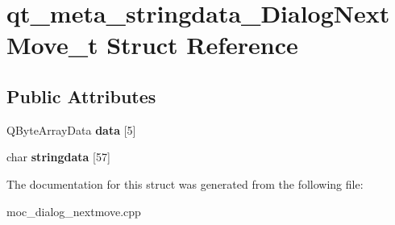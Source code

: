 \hypertarget{structqt__meta__stringdata__DialogNextMove__t}{\section{qt\-\_\-meta\-\_\-stringdata\-\_\-\-Dialog\-Next\-Move\-\_\-t Struct Reference}
\label{structqt__meta__stringdata__DialogNextMove__t}
}
\subsection*{Public Attributes}
\begin{DoxyCompactItemize}
\item 
\hypertarget{structqt__meta__stringdata__DialogNextMove__t_a0009eb2ef561102724f87fa9fd1028fc}{Q\-Byte\-Array\-Data {\bfseries data} \mbox{[}5\mbox{]}}\label{structqt__meta__stringdata__DialogNextMove__t_a0009eb2ef561102724f87fa9fd1028fc}

\item 
\hypertarget{structqt__meta__stringdata__DialogNextMove__t_a043103d55e547887ada1d2142419ed05}{char {\bfseries stringdata} \mbox{[}57\mbox{]}}\label{structqt__meta__stringdata__DialogNextMove__t_a043103d55e547887ada1d2142419ed05}

\end{DoxyCompactItemize}


The documentation for this struct was generated from the following file\-:\begin{DoxyCompactItemize}
\item 
moc\-\_\-dialog\-\_\-nextmove.\-cpp\end{DoxyCompactItemize}
